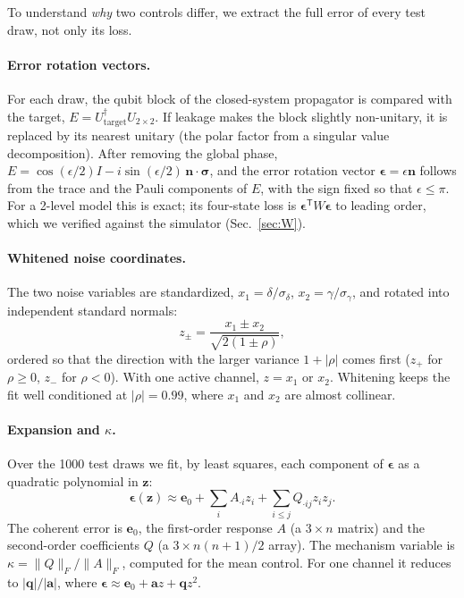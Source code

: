 \documentclass[aps,pra,onecolumn,notitlepage,superscriptaddress,nofootinbib,floatfix]{revtex4-2}
\begin{document}
To understand \emph{why} two controls differ, we extract the full error
of every test draw, not only its loss.

\paragraph*{Error rotation vectors.} For each draw, the qubit block of the
closed-system propagator is compared with the target,
$E=U_{\mathrm{target}}^\dagger U_{2\times2}$. If leakage makes the block
slightly non-unitary, it is replaced by its nearest unitary (the polar factor
from a singular value decomposition). After removing the global phase,
$E=\cos(\epsilon/2)I-i\sin(\epsilon/2)\,\mathbf n\cdot\boldsymbol\sigma$, and
the error rotation vector $\boldsymbol\epsilon=\epsilon\mathbf n$ follows from
the trace and the Pauli components of $E$, with the sign fixed so that
$\epsilon\le\pi$. For a 2-level model this is exact; its four-state loss is
$\boldsymbol\epsilon^{\mathsf T}W\boldsymbol\epsilon$ to leading order, which
we verified against the simulator (Sec.~\ref{sec:W}).

\paragraph*{Whitened noise coordinates.} The two noise variables are
standardized, $x_1=\delta/\sigma_\delta$, $x_2=\gamma/\sigma_\gamma$, and
rotated into independent standard normals:
\begin{equation}
z_\pm=\frac{x_1\pm x_2}{\sqrt{2(1\pm\rho)}} ,
\label{eq:whiten}
\end{equation}
ordered so that the direction with the larger variance $1+|\rho|$ comes first
($z_+$ for $\rho\ge0$, $z_-$ for $\rho<0$). With one active channel,
$z=x_1$ or $x_2$. Whitening keeps the fit well conditioned at $|\rho|=0.99$,
where $x_1$ and $x_2$ are almost collinear.

\paragraph*{Expansion and $\kappa$.} Over the 1000 test draws we fit, by least
squares, each component of $\boldsymbol\epsilon$ as a quadratic polynomial in
$\mathbf z$:
\begin{equation}
\boldsymbol\epsilon(\mathbf z)\approx\mathbf e_0+\sum_iA_{\cdot i}z_i+\sum_{i\le j}Q_{\cdot ij}z_iz_j .
\label{eq:fit}
\end{equation}
The coherent error is $\mathbf e_0$, the first-order response $A$ (a
$3\times n$ matrix) and the second-order coefficients $Q$ (a $3\times
n(n+1)/2$ array). The mechanism variable is
$\kappa=\|Q\|_F/\|A\|_F$, computed for the mean control. For one channel
it reduces to $|\mathbf q|/|\mathbf a|$, where $\boldsymbol\epsilon\approx\mathbf e_0+\mathbf az+\mathbf qz^2$.
\end{document}
